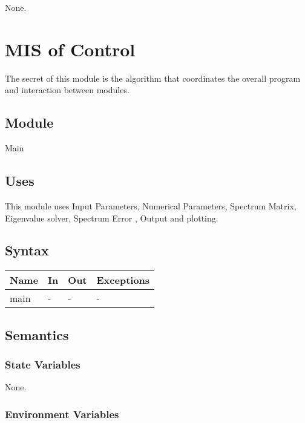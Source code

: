 \documentclass[12pt, titlepage]{article}
\begin{document}
None. 

\newpage 


\section{MIS of Control} \label{MCON}

The secret of this module is the algorithm that coordinates the overall program 
and 
interaction between modules.

\subsection{Module}

Main

\subsection{Uses}

This module uses Input Parameters, Numerical Parameters, Spectrum Matrix, 
Eigenvalue solver, Spectrum Error , Output and plotting.

\subsection{Syntax}

\begin{center}
	\begin{tabular}{p{2cm} p{6cm} p{6cm} p{3cm}}
		\hline
		\textbf{Name} & \textbf{In} & \textbf{Out} & \textbf{Exceptions} \\
		\hline
		main & - & - & - \\ 
		\hline
	\end{tabular}
\end{center}

\subsection{Semantics}

\subsubsection{State Variables}

None.

\subsubsection{Environment Variables}
\end{document}
